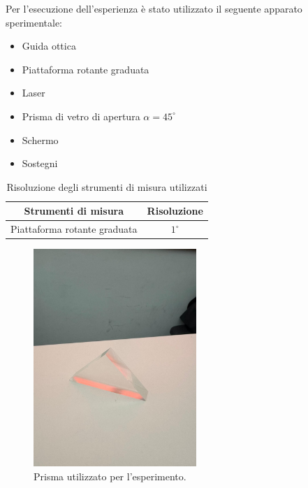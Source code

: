 Per l'esecuzione dell'esperienza è stato utilizzato il seguente apparato sperimentale:
\begin{itemize}
	\item Guida ottica
	\item Piattaforma rotante graduata
	\item Laser
	\item Prisma di vetro di apertura $\alpha=45^{\circ}$
	\item Schermo
	\item Sostegni
\end{itemize}

\begin{table}[H]
	\centering
	\begin{tabular}{|c|c|}
		\hline
		\textbf{Strumenti di misura} & \textbf{Risoluzione} \\
		\hline
		Piattaforma rotante graduata & $1^{\circ}$ \\
		\hline
	\end{tabular}
	\caption{Risoluzione degli strumenti di misura utilizzati}
	\label{tab:}
\end{table}

\begin{figure}[H]
	\centering
	\includegraphics[width=0.55\textwidth]{./figures/prisma}
	\caption{Prisma utilizzato per l'esperimento.}
\end{figure}

